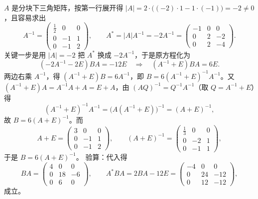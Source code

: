 \begin{solution}
$A$ 是分块下三角矩阵，按第一行展开得 $|A|=2\cdot\bigl((-2)\cdot1-1\cdot(-1)\bigr)=-2\ne0$，且容易求出
\[
A^{-1}=\begin{pmatrix}\frac12&0&0\\0&-1&1\\0&-1&2\end{pmatrix},
\qquad
A^{*}=|A|A^{-1}=-2A^{-1}=\begin{pmatrix}-1&0&0\\0&2&-2\\0&2&-4\end{pmatrix}.
\]
关键一步是用 $|A|=-2$ 把 $A^{*}$ 换成 $-2A^{-1}$，于是原方程化为
\[
(-2A^{-1}-2E)BA=-12E
\quad\Longrightarrow\quad
(A^{-1}+E)BA=6E .
\]
两边右乘 $A^{-1}$，得 $(A^{-1}+E)B=6A^{-1}$，即 $B=6(A^{-1}+E)^{-1}A^{-1}$。又 $(A^{-1}+E)A=A^{-1}A+A=E+A$，由 $(AQ)^{-1}=Q^{-1}A^{-1}$（取 $Q=A^{-1}+E$）得
\[
(A^{-1}+E)^{-1}A^{-1}=\bigl(A(A^{-1}+E)\bigr)^{-1}=(A+E)^{-1},
\]
故 $B=6(A+E)^{-1}$。而
\[
A+E=\begin{pmatrix}3&0&0\\0&-1&1\\0&-1&2\end{pmatrix},
\qquad
(A+E)^{-1}=\begin{pmatrix}\frac13&0&0\\0&-2&1\\0&-1&1\end{pmatrix},
\]
于是 $B=6(A+E)^{-1}$。
验算：代入得
\[
BA=\begin{pmatrix}4&0&0\\0&18&-6\\0&6&0\end{pmatrix},
\qquad
A^{*}BA=2BA-12E=\begin{pmatrix}-4&0&0\\0&24&-12\\0&12&-12\end{pmatrix},
\]
成立。
\end{solution}

